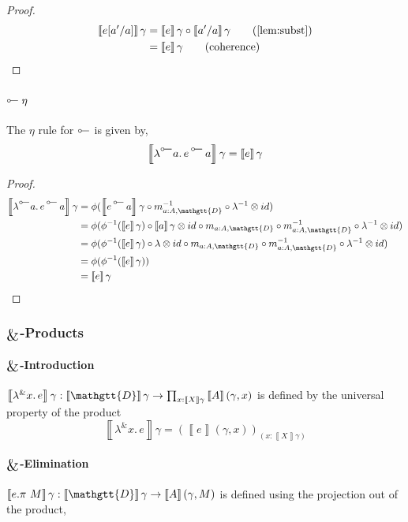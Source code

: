 \documentclass[acmsmall,nonacm]{acmart}
\renewcommand{\Delta}{\mathgtt{D}}
\newcommand{\sem}[1]{\left\llbracket{#1}\right\rrbracket}
\newcommand{\semg}[1]{\sem{#1}\gamma}
\newcommand{\lto}{\multimap}
\newcommand{\tol}{\mathrel{\rotatebox[origin=c]{180}{$\lto$}}}
\DeclareMathOperator*{\bigamp}{\scalerel*{\&}{\bigoplus}}
\newcommand{\lambtol}[2]{\lambda^{{\tol}} #1.\, #2}
\newcommand{\dlamb}[2]{{\lambda}^{{\&}} #1.\, #2}
\newcommand{\apptol}[2]{#1 \mathop{{}^{\tol}} #2}
\begin{document}
{\begin{proof}
\begin{align*}
  \semg{e[a'/a]}
  & = \semg{e} \circ \semg{a'/a} \tag{\cref{lem:subst}} \\
  & = \semg{e} \tag{coherence}
\end{align*}
\end{proof}

\paragraph{$\tol\eta$}
The $\eta$ rule for $\tol$ is given by,
\[
  \semg{\lambtol {a} {\apptol e a}} = \semg{e}
\]
\begin{proof}
\begin{align*}
  \semg{\lambtol {a} {\apptol e a}}
  & = \phi(\semg{\apptol e a} \circ m^{-1}_{a:A,\Delta} \circ \lambda^{-1} \otimes id) \\
  & = \phi(\phi^{-1}(\semg{e}) \circ \semg{a} \otimes id \circ m_{a:A,\Delta} \circ m^{-1}_{a:A,\Delta} \circ \lambda^{-1} \otimes id) \\
  & = \phi(\phi^{-1}(\semg{e}) \circ \lambda \otimes id \circ m_{a:A,\Delta} \circ m^{-1}_{a:A,\Delta} \circ \lambda^{-1} \otimes id) \\
  & = \phi(\phi^{-1}(\semg{e})) \\
  & = \semg{e}
\end{align*}
\end{proof}

\subsubsection{$\bigamp$-Products}
\paragraph{$\bigamp$-Introduction}
$\semg{\dlamb x e} : \semg{\Delta} \to \prod_{x : \semg{X}} {\sem{A}(\gamma , x)}$ is
defined by the universal property of the product
\[
\semg{\dlamb x e} = \left( \sem{e}(\gamma , x) \right)_{(x : \semg{X})}
\]

\paragraph{$\bigamp$-Elimination}
$\semg{e.\pi~M} : \semg{\Delta} \to \sem{A}(\gamma , M)$ is defined using the
projection out of the product,

\begin{center}
\end{center}

}
\end{document}
